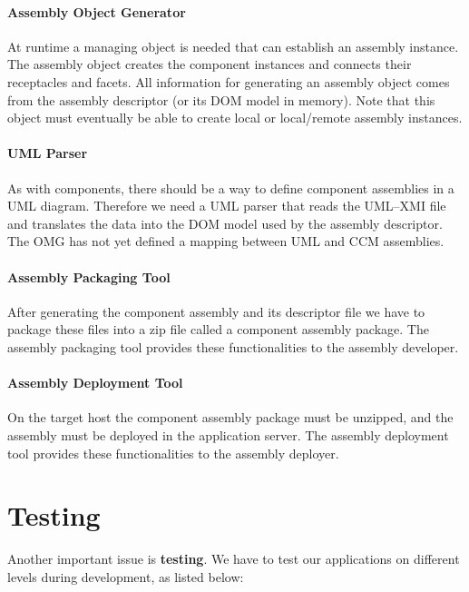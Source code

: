 \paragraph{Assembly Object Generator}

At runtime a managing object is needed that can establish an assembly instance.
The assembly object creates the component instances and connects their
receptacles and facets. All information for generating an assembly object comes
from the assembly descriptor (or its DOM model in memory). Note that this object
must eventually be able to create local or local/remote assembly instances.

\paragraph{UML Parser}

As with components, there should be a way to define component assemblies in a
UML diagram. Therefore we need a UML parser that reads the UML--XMI file and
translates the data into the DOM model used by the assembly descriptor. The OMG
has not yet defined a mapping between UML and CCM assemblies.

\paragraph{Assembly Packaging Tool}

After generating the component assembly and its descriptor file we have to
package these files into a zip file called a component assembly package. The
assembly packaging tool provides these functionalities to the assembly
developer.

\paragraph{Assembly Deployment Tool}

On the target host the component assembly package must be unzipped, and the
assembly must be deployed in the application server. The assembly deployment
tool provides these functionalities to the assembly deployer.

\section{Testing}

Another important issue is {\bf testing}. We have to test our applications on
different levels during development, as listed below:

